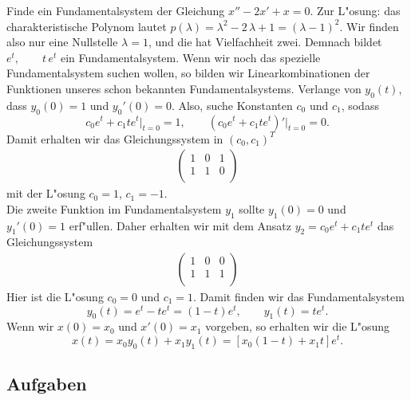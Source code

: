 \begin{bspX}
Finde ein Fundamentalsystem der Gleichung $ x''-2x'+x=0.$ 
Zur L"osung: das charakteristische Polynom lautet
$p(\lambda) = \lambda^2-2\,\lambda +1 = (\lambda-1)^2$.
Wir finden also nur eine Nullstelle $\lambda=1$, und die hat Vielfachheit zwei. 
Demnach bildet $ e^{t},\qquad t\, e^{t}$ ein Fundamentalsystem. Wenn wir noch 
das spezielle Fundamentalsystem suchen wollen, 
so bilden wir Linearkombinationen der Funktionen unseres schon bekannten 
Fundamentalsystems. Verlange von $y_0(t)$, dass $y_0(0) = 1$ und $y_0'(0) = 0$. 
Also, suche Konstanten $c_0$ und $c_1$, sodass
$$ 
c_0e^{t}+c_1te^t \bigg|_{t=0}= 1,\qquad
\left(c_0e^{t}+c_1te^t\right)' \bigg|_{t=0}= 0.
$$
Damit erhalten wir das Gleichungssystem in $(c_0, c_1)^T$
\begin{eqnarray*}
\left(\begin{array}{cc|c} 
1 & 0 & 1\\
1 & 1 & 0\\
\end{array}\right)
\end{eqnarray*}
mit der L"osung $c_0=1$, $c_1=-1$.\\
Die zweite Funktion im Fundamentalsystem $y_1$ sollte $y_1(0) = 0$ und $y_1'(0) = 1$ erf"ullen.
Daher erhalten wir mit dem Ansatz $y_2 = c_0 e^t + c_1 t e^t$ das Gleichungssystem
\begin{eqnarray*}
\left(\begin{array}{cc|c} 
1 & 0 & 0\\
1 & 1 & 1\\
\end{array}\right)
\end{eqnarray*}
Hier ist die L"osung $c_0=0$ und $c_1=1$. Damit finden wir das Fundamentalsystem
$$y_0(t) = e^t-te^t = (1-t)e^t,\qquad y_1(t) = te^t.$$
Wenn wir $x(0)=x_0$ und $x'(0)=x_1$ vorgeben, so erhalten wir die L"osung
$$ x(t) = x_0y_0(t)+x_1y_1(t) = [x_0(1-t)+x_1t]e^t.$$
\end{bspX}
\subsection*{Aufgaben}
\begin{auf}\chb\label{block3A3}

\end{auf}

\begin{auf}\chb\label{block3A4}

\end{auf}

\begin{auf}\cha\label{block4A4}

\end{auf}
